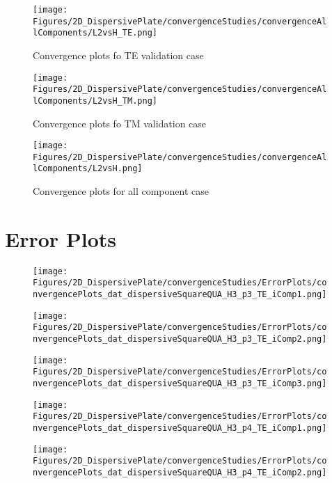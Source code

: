 \begin{figure}
\texttt{[image: Figures/2D\_DispersivePlate/convergenceStudies/convergenceAllComponents/L2vsH\_TE.png]}
\caption{Convergence plots fo TE validation case}
\end{figure}

\begin{figure}
\texttt{[image: Figures/2D\_DispersivePlate/convergenceStudies/convergenceAllComponents/L2vsH\_TM.png]}
\caption{Convergence plots fo TM validation case}
\end{figure}

\begin{figure}
\texttt{[image: Figures/2D\_DispersivePlate/convergenceStudies/convergenceAllComponents/L2vsH.png]}
\caption{Convergence plots for all component case}
\end{figure}

\clearpage
\section{Error Plots}

\begin{figure}
\texttt{[image: Figures/2D\_DispersivePlate/convergenceStudies/ErrorPlots/convergencePlots\_dat\_dispersiveSquareQUA\_H3\_p3\_TE\_iComp1.png]}
\end{figure}

\begin{figure}
\texttt{[image: Figures/2D\_DispersivePlate/convergenceStudies/ErrorPlots/convergencePlots\_dat\_dispersiveSquareQUA\_H3\_p3\_TE\_iComp2.png]}
\end{figure}

\begin{figure}
\texttt{[image: Figures/2D\_DispersivePlate/convergenceStudies/ErrorPlots/convergencePlots\_dat\_dispersiveSquareQUA\_H3\_p3\_TE\_iComp3.png]}
\end{figure}

\begin{figure}
\texttt{[image: Figures/2D\_DispersivePlate/convergenceStudies/ErrorPlots/convergencePlots\_dat\_dispersiveSquareQUA\_H3\_p4\_TE\_iComp1.png]}
\end{figure}

\begin{figure}
\texttt{[image: Figures/2D\_DispersivePlate/convergenceStudies/ErrorPlots/convergencePlots\_dat\_dispersiveSquareQUA\_H3\_p4\_TE\_iComp2.png]}
\end{figure}

